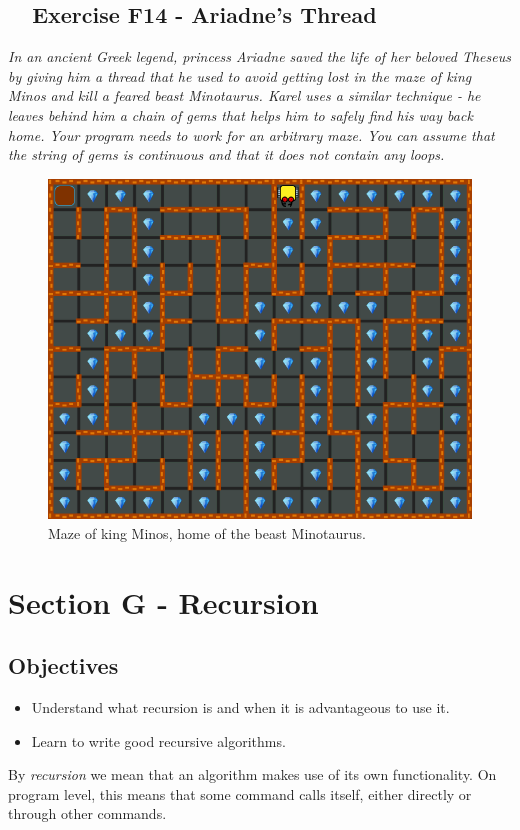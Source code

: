 \documentclass[article,A4,12pt]{llncs}
\begin{document}
{{{{\subsection{\ \ Exercise F14 - Ariadne's Thread}

{\em In an ancient Greek legend, princess Ariadne saved the life of her 
beloved Theseus by giving him a thread that he used to avoid getting lost 
in the maze of king Minos and kill a feared beast Minotaurus. Karel uses 
a similar technique - he leaves behind him a chain of gems that helps him 
to safely find his way back home. Your program needs to work for an 
arbitrary maze. You can assume that the string of gems is continuous 
and that it does not contain any loops.}\\[-7mm]

\begin{figure}[!ht]
\begin{center}
\includegraphics[height=0.4\textwidth]{img/f14.png}
\end{center}
\vspace{-4mm}
\caption{Maze of king Minos, home of the beast Minotaurus.}
\label{fig:f14}
\vspace{-10mm}
\end{figure}
\noindent

\newpage

\section{Section G - Recursion}

\subsection{Objectives} 
 
\begin{itemize}
\item Understand what recursion is and when it is advantageous to use it.
\item Learn to write good recursive algorithms.
\end{itemize}
By {\em recursion} we mean that an algorithm makes use of its own functionality. On program level,
this means that some command calls itself, either directly or through other commands.

}}}}
\end{document}
